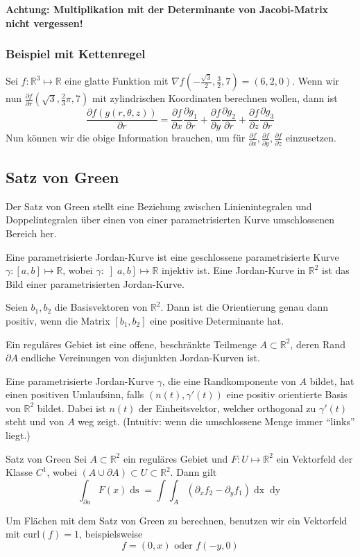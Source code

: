 \documentclass[a4paper,10pt]{article}
\def\R{\mathbb{R}}
\begin{document}
\textbf{Achtung: Multiplikation mit der Determinante von Jacobi-Matrix nicht vergessen!}

\subsubsection*{Beispiel mit Kettenregel}
Sei \(f: \R^3 \mapsto \R\) eine glatte Funktion mit \(\nabla f \left(-\frac{\sqrt{3}}{2}, \frac{3}{2},7\right) = (6,2,0)\). Wenn wir nun \(\frac{\partial f}{\partial r}\left(\sqrt{3}, \frac{2}{3}\pi, 7\right)\) mit zylindrischen Koordinaten berechnen wollen, dann ist
\[\frac{\partial f(g(r,\theta,z))}{\partial r} = \frac{\partial f}{\partial x} \frac{\partial g_1}{\partial r} + \frac{\partial f}{\partial y} \frac{\partial g_2}{\partial r} + \frac{\partial f}{\partial z} \frac{\partial g_3}{\partial r}\]
Nun können wir die obige Information brauchen, um für \(\frac{\partial f}{\partial x}, \frac{\partial f}{\partial y}, \frac{\partial f}{\partial z}\) einzusetzen.

\subsection{Satz von Green}
Der Satz von Green stellt eine Beziehung zwischen Linienintegralen und Doppelintegralen über einen von einer parametrisierten Kurve umschlossenen Bereich her. 

Eine parametrisierte Jordan-Kurve ist eine geschlossene parametrisierte Kurve \(\gamma : \left[a,b\right] \mapsto \R\), wobei \(\gamma : \left] a,b \right] \mapsto \R\) injektiv ist. Eine Jordan-Kurve in \(\R^2\) ist das Bild einer parametrisierten Jordan-Kurve.

Seien \(b_1, b_2\) die Basisvektoren von \(\R^2\). Dann ist die Orientierung genau dann positiv, wenn die Matrix \(\left[b_1, b_2\right]\) eine positive Determinante hat.

Ein reguläres Gebiet ist eine offene, beschränkte Teilmenge \(A\subset \R^2\), deren Rand \(\partial A\) endliche Vereinungen von disjunkten Jordan-Kurven ist.

Eine parametrisierte Jordan-Kurve \(\gamma\), die eine Randkomponente von \(A\) bildet, hat einen positiven Umlaufsinn, falls \((n(t), \gamma'(t))\) eine positiv orientierte Basis von \(\R^2\) bildet. Dabei ist \(n(t)\) der Einheitsvektor, welcher orthogonal zu \(\gamma'(t)\) steht und von \(A\) weg zeigt. (Intuitiv: wenn die umschlossene Menge immer ``links'' liegt.)

\begin{mainbox}{Satz von Green}
  Sei \(A \subset \R^2\) ein reguläres Gebiet und \(F: U \mapsto \R^2\) ein Vektorfeld der Klasse \(C^1\), wobei \((A \cup \partial A) \subset U \subset \R^2\). Dann gilt
  \[\int_{\partial a} F(x) \mathop{ds} = \int \int_A \left(\partial_x f_2 - \partial_y f_1\right) \mathop{dx} \mathop{dy}\]
\end{mainbox}
Um Flächen mit dem Satz von Green zu berechnen, benutzen wir ein Vektorfeld mit \(\text{curl}(f) = 1\), beispielsweise \[f = (0,x) \text{ oder } f(-y, 0)\]
\end{document}
